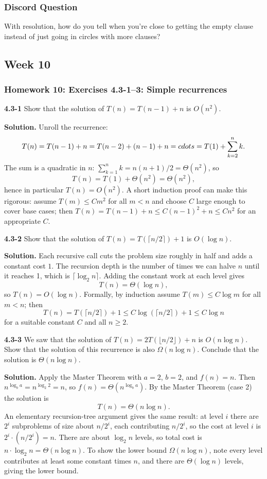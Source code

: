 \documentclass{article}
\theoremstyle{theorem}
\theoremstyle{definition}
\theoremstyle{remark}
\begin{document}
\subsubsection{Discord Question}

With resolution, how do you tell when you’re close to getting the empty clause instead of just going in circles with more clauses?

\subsection{Week 10}

\subsubsection{Homework 10: Exercises 4.3-1--3: Simple recurrences}

\textbf{4.3-1}
Show that the solution of $T(n)=T(n-1)+n$ is $O(n^2)$.

\textbf{Solution.}
Unroll the recurrence:
\[
T(n)=T(n-1)+n= T(n-2)+(n-1)+n=\\cdots = T(1)+\sum_{k=2}^n k.
\]
The sum is a quadratic in $n$: $\sum_{k=1}^n k = n(n+1)/2=\Theta(n^2)$, so
\[T(n)=T(1)+\Theta(n^2)=\Theta(n^2),\]
hence in particular $T(n)=O(n^2)$. A short induction proof can make this rigorous: assume $T(m)\le C m^2$ for all $m<n$ and choose $C$ large enough to cover base cases; then $T(n)=T(n-1)+n\le C(n-1)^2+n\le Cn^2$ for an appropriate $C$.

\vspace{0.2cm}
\textbf{4.3-2}
Show that the solution of $T(n)=T(\lceil n/2\rceil)+1$ is $O(\log n)$.

\textbf{Solution.}
Each recursive call cuts the problem size roughly in half and adds a constant cost $1$. The recursion depth is the number of times we can halve $n$ until it reaches 1, which is $\lceil\log_2 n\rceil$. Adding the constant work at each level gives
\[T(n)=\Theta(\log n),\]
so $T(n)=O(\log n)$. Formally, by induction assume $T(m)\le C\log m$ for all $m<n$; then
\[T(n)=T(\lceil n/2\rceil)+1\le C\log(\lceil n/2\rceil)+1\le C\log n\]
for a suitable constant $C$ and all $n\ge 2$.

\vspace{0.2cm}
\textbf{4.3-3}
We saw that the solution of $T(n)=2T(\lfloor n/2\rfloor)+n$ is $O(n\log n)$. Show that the solution of this recurrence is also $\Omega(n\log n)$. Conclude that the solution is $\Theta(n\log n)$.

\textbf{Solution.}
Apply the Master Theorem with $a=2$, $b=2$, and $f(n)=n$. Then $n^{\log_b a}=n^{\log_2 2}=n$, so $f(n)=\Theta(n^{\log_b a})$. By the Master Theorem (case 2) the solution is
\[T(n)=\Theta(n\log n).\]
An elementary recursion-tree argument gives the same result: at level $i$ there are $2^i$ subproblems of size about $n/2^i$, each contributing $n/2^i$, so the cost at level $i$ is $2^i\cdot (n/2^i)=n$. There are about $\log_2 n$ levels, so total cost is $n\cdot\log_2 n=\Theta(n\log n)$. To show the lower bound $\Omega(n\log n)$, note every level contributes at least some constant times $n$, and there are $\Theta(\log n)$ levels, giving the lower bound.
\end{document}
